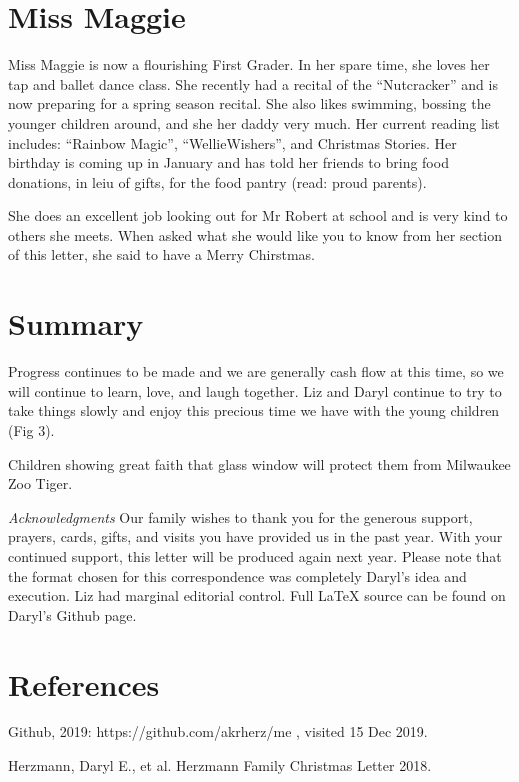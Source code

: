 \documentclass[letterpaper,11pt]{article}
\makeatletter
\def\refer{\par\noindent\hangindent\parindent\hangafter1}
\newenvironment{figurehere}
  {\def\@captype{figure}}
  {}
\makeatother
\begin{document}
\begin{multicols}{2}
\bigskip

\section{Miss Maggie}

Miss Maggie is now a flourishing First Grader. In her spare time, she loves her
tap and ballet dance class.  She recently had a recital of the \enquote{Nutcracker}
and is now preparing for a spring season recital.  She also likes swimming,
bossing the younger children around, and she  her daddy very
much.  Her current reading list includes:
\enquote{Rainbow Magic}, \enquote{WellieWishers\texttrademark}, and
Christmas Stories.  Her birthday is coming up in January and has told her
friends to bring food donations, in leiu of gifts, for the food pantry (read: proud parents).

She does an excellent job looking out for Mr Robert at school and is very kind
to others she meets.  When asked what she would like you to know from her
section of this letter, she said to have a Merry Chirstmas.

\section{Summary}

Progress continues to be made and we are generally cash flow  at this
time, so we will continue to learn, love, and laugh together.  Liz and Daryl continue
to try to take things slowly and enjoy this precious time we have with the young
children (Fig 3).

\bigskip

\begin{figurehere}
 \centering   
 \caption{Children showing great faith that glass window will protect them from Milwaukee Zoo Tiger.}
\end{figurehere}

\bigskip

\emph{Acknowledgments} Our family wishes to thank you for the generous 
support, prayers, cards, gifts, and visits you have provided us in the past
year. With your continued support, this letter will be produced again
next year. Please note that the format chosen for this
correspondence was completely Daryl's idea and execution. Liz had marginal
editorial control. Full \LaTeX\xspace source can be found on Daryl's Github
page.

\section{References}

\refer Github, 2019: https://github.com/akrherz/me , visited 15 Dec 2019.
\refer Herzmann, Daryl E., et al. Herzmann Family Christmas Letter 2018.

\end{multicols}
\end{document}
